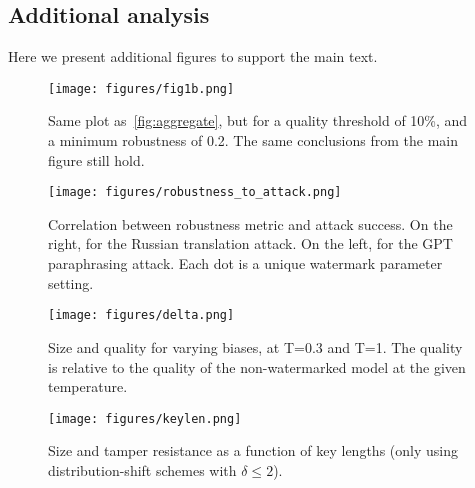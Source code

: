 \subsection{Additional analysis}
\label{app:ssec:additional_figures}

Here we present additional figures to support the main text.

\begin{figure}
    \centering
    \texttt{[image: figures/fig1b.png]}
    \caption{Same plot as~\cref{fig:aggregate}, but for a quality threshold of 10\%, and a minimum robustness of 0.2. The same conclusions from the main figure still hold.}
    \label{fig:aggregate2}
\end{figure}

\begin{figure}[t]
    \texttt{[image: figures/robustness\_to\_attack.png]}
    \centering
    \caption{Correlation between robustness metric and attack success. On the right, for the Russian translation attack. 
    On the left, for the GPT paraphrasing attack. Each dot is a unique watermark parameter setting.}
    \label{fig:robustness-to-attacks}
\end{figure}

\begin{figure}[t]
\texttt{[image: figures/delta.png]}
\centering
\caption{Size and quality for varying biases, at T=0.3 and T=1. The quality is relative to the quality of the non-watermarked model at the given temperature.}
\label{bias-fig}
\end{figure}

\begin{figure}[t]
\texttt{[image: figures/keylen.png]}
\centering
\caption{Size and tamper resistance as a function of key lengths (only using distribution-shift schemes with $\delta \leq 2$).}
\label{keylen-fig}
\end{figure}